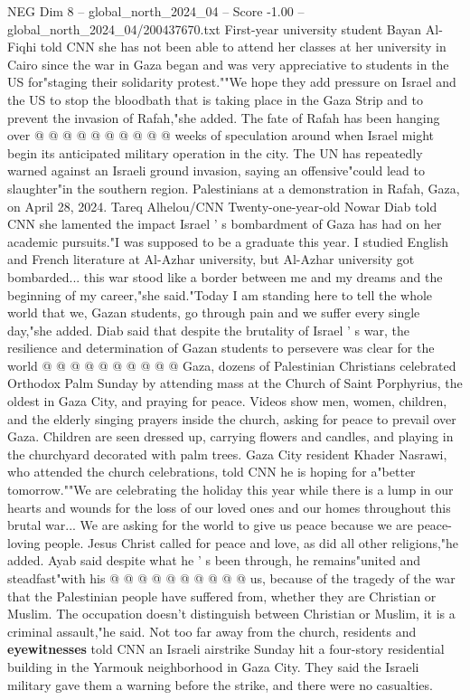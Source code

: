 \begin{textsample}{NEG Dim 8 – global\_north\_2024\_04 – Score -1.00 – global\_north\_2024\_04/200437670.txt}
First-year university student Bayan Al-Fiqhi told CNN she has not been able to attend her classes at her university in Cairo since the war in Gaza began and was very appreciative to students in the US for"staging their solidarity protest.""We hope they add pressure on Israel and the US to stop the bloodbath that is taking place in the Gaza Strip and to prevent the invasion of Rafah,"she added.
The fate of Rafah has been hanging over @ @ @ @ @ @ @ @ @ @ weeks of speculation around when Israel might begin its anticipated military operation in the city.
The UN has repeatedly warned against an Israeli ground invasion, saying an offensive"could lead to slaughter"in the southern region.
Palestinians at a demonstration in Rafah, Gaza, on April 28, 2024.
Tareq Alhelou/CNN Twenty-one-year-old Nowar Diab told CNN she lamented the impact Israel ' s bombardment of Gaza has had on her academic pursuits."I was supposed to be a graduate this year.
I studied English and French literature at Al-Azhar university, but Al-Azhar university got bombarded... this war stood like a border between me and my dreams and the beginning of my career,"she said."Today I am standing here to tell the whole world that we, Gazan students, go through pain and we suffer every single day,"she added.
Diab said that despite the brutality of Israel ' s war, the resilience and determination of Gazan students to persevere was clear for the world @ @ @ @ @ @ @ @ @ @ Gaza, dozens of Palestinian Christians celebrated Orthodox Palm Sunday by attending mass at the Church of Saint Porphyrius, the oldest in Gaza City, and praying for peace.
Videos show men, women, children, and the elderly singing prayers inside the church, asking for peace to prevail over Gaza.
Children are seen dressed up, carrying flowers and candles, and playing in the churchyard decorated with palm trees.
Gaza City resident Khader Nasrawi, who attended the church celebrations, told CNN he is hoping for a"better tomorrow.""We are celebrating the holiday this year while there is a lump in our hearts and wounds for the loss of our loved ones and our homes throughout this brutal war...
We are asking for the world to give us peace because we are peace-loving people.
Jesus Christ called for peace and love, as did all other religions,"he added.
Ayab said despite what he ' s been through, he remains"united and steadfast"with his @ @ @ @ @ @ @ @ @ @ us, because of the tragedy of the war that the Palestinian people have suffered from, whether they are Christian or Muslim.
The occupation doesn't distinguish between Christian or Muslim, it is a criminal assault,"he said.
Not too far away from the church, residents and \textbf{eyewitnesses} told CNN an Israeli airstrike Sunday hit a four-story residential building in the Yarmouk neighborhood in Gaza City.
They said the Israeli military gave them a warning before the strike, and there were no casualties.

\end{textsample}
